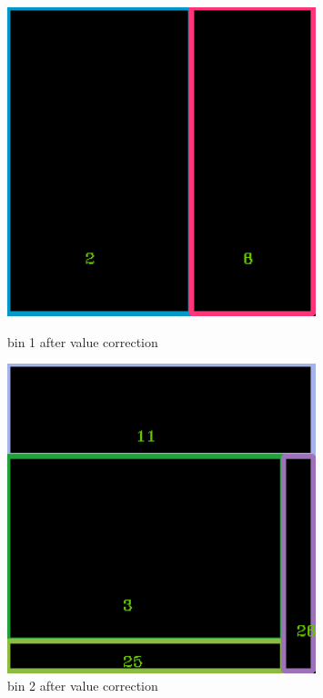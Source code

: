 \documentclass[11pt]{article}
\begin{document}
    \begin{figure}
    \begin{minipage}[htb]{0.33\linewidth}
    \centering
    \includegraphics[width=0.8\textwidth]{FIGS/2/output1.png}
    \caption{bin 1 after value correction}
    \label{skyline}
    \end{minipage}
    \begin{minipage}[htb]{0.33\linewidth}
    \centering
    \includegraphics[width=0.8\textwidth]{FIGS/2/output2.png}
    \caption{bin 2 after value correction}
    \label{skyline}
    \end{minipage}

\end{figure}
\end{document}
